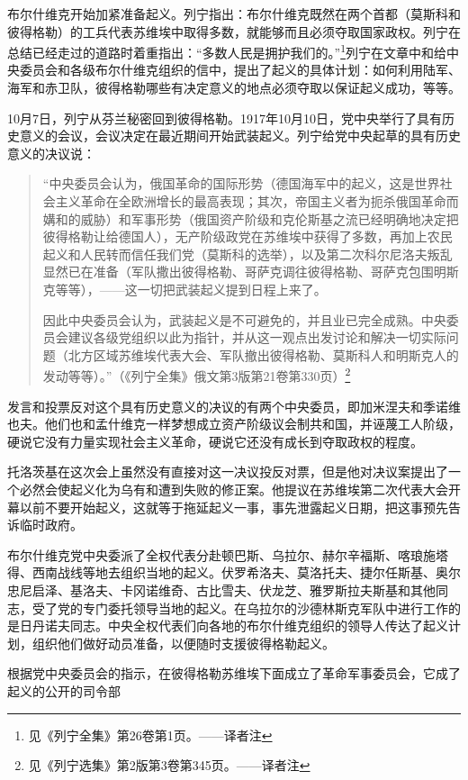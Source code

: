 布尔什维克开始加紧准备起义。列宁指出：布尔什维克既然在两个首都（莫斯科和彼得格勒）的工兵代表苏维埃中取得多数，就能够而且必须夺取国家政权。列宁在总结已经走过的道路时着重指出：“多数人民是拥护我们的。”\footnote{见《列宁全集》第26卷第1页。——译者注}列宁在文章中和给中央委员会和各级布尔什维克组织的信中，提出了起义的具体计划：如何利用陆军、海军和赤卫队，彼得格勒哪些有决定意义的地点必须夺取以保证起义成功，等等。

10月7日，列宁从芬兰秘密回到彼得格勒。1917年10月10日，党中央举行了具有历史意义的会议，会议决定在最近期间开始武装起义。列宁给党中央起草的具有历史意义的决议说：

\begin{quotation}
“中央委员会认为，俄国革命的国际形势（德国海军中的起义，这是世界社会主义革命在全欧洲增长的最高表现；其次，帝国主义者为扼杀俄国革命而媾和的威胁）和军事形势（俄国资产阶级和克伦斯基之流已经明确地决定把彼得格勒让给德国人），无产阶级政党在苏维埃中获得了多数，再加上农民起义和人民转而信任我们党（莫斯科的选举），以及第二次科尔尼洛夫叛乱显然已在准备（军队撒出彼得格勒、哥萨克调往彼得格勒、哥萨克包围明斯克等等），——这一切把武装起义提到日程上来了。

因此中央委员会认为，武装起义是不可避免的，并且业已完全成熟。中央委员会建议各级党组织以此为指针，并从这一观点出发讨论和解决一切实际问题（北方区域苏维埃代表大会、军队撤出彼得格勒、莫斯科人和明斯克人的发动等等）。”（《列宁全集》俄文第3版第21卷第330页）\footnote{见《列宁选集》第2版第3卷第345页。——译者注}
\end{quotation}

发言和投票反对这个具有历史意义的决议的有两个中央委员，即加米涅夫和季诺维也夫。他们也和孟什维克一样梦想成立资产阶级议会制共和国，并诬蔑工人阶级，硬说它没有力量实现社会主义革命，硬说它还没有成长到夺取政权的程度。

托洛茨基在这次会上虽然没有直接对这一决议投反对票，但是他对决议案提出了一个必然会使起义化为乌有和遭到失败的修正案。他提议在苏维埃第二次代表大会开幕以前不要开始起义，这就等于拖延起义一事，事先泄露起义日期，把这事预先告诉临时政府。

布尔什维克党中央委派了全权代表分赴顿巴斯、乌拉尔、赫尔辛福斯、喀琅施塔得、西南战线等地去组织当地的起义。伏罗希洛夫、莫洛托夫、捷尔任斯基、奥尔忠尼启泽、基洛夫、卡冈诺维奇、古比雪夫、伏龙芝、雅罗斯拉夫斯基和其他同志，受了党的专门委托领导当地的起义。在乌拉尔的沙德林斯克军队中进行工作的是日丹诺夫同志。中央全权代表们向各地的布尔什维克组织的领导人传达了起义计划，组织他们做好动员准备，以便随时支援彼得格勒起义。

根据党中央委员会的指示，在彼得格勒苏维埃下面成立了革命军事委员会，它成了起义的公开的司令部

